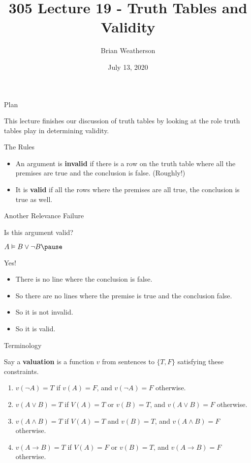 \documentclass[
  ignorenonframetext,
]{beamer}
\title{305 Lecture 19 - Truth Tables and Validity}
\author{Brian Weatherson}
\date{July 13, 2020}
\providecommand{\tightlist}{%
  \setlength{\itemsep}{0pt}\setlength{\parskip}{0pt}}
\renewcommand{\,}{\text{, }}
\renewenvironment*{quote}	
	{\list{}{\rightmargin   \leftmargin} \item } 	
	{\endlist }
\begin{document}
\frame{\titlepage}

\begin{frame}{Plan}
\protect\hypertarget{plan}{}

This lecture finishes our discussion of truth tables by looking at the
role truth tables play in determining validity.

\end{frame}

\begin{frame}{The Rules}
\protect\hypertarget{the-rules}{}

\begin{itemize}
\tightlist
\item
  An argument is \textbf{invalid} if there is a row on the truth table
  where all the premises are true and the conclusion is false.
  (Roughly!)
\item
  It is \textbf{valid} if all the rows where the premises are all true,
  the conclusion is true as well.
\end{itemize}

\end{frame}

\begin{frame}{Another Relevance Failure}
\protect\hypertarget{another-relevance-failure}{}

Is this argument valid?

\begin{quote}
\(A \vDash B \vee \neg B \pause\)
\end{quote}

Yes!

\begin{itemize}
\tightlist
\item
  There is no line where the conclusion is false.
\item
  So there are no lines where the premise is true and the conclusion
  false.
\item
  So it is not invalid.
\item
  So it is valid.
\end{itemize}

\end{frame}

\begin{frame}{Terminology}
\protect\hypertarget{terminology}{}

Say a \textbf{valuation} is a function \(v\) from sentences to
\(\{T, F\}\) satisfying these constraints.

\begin{enumerate}
\tightlist
\item
  \(v(\neg A) = T\) if \(v(A) = F\), and \(v(\neg A) = F\) otherwise.
\item
  \(v(A \vee B) = T\) if \(V(A) = T\) or \(v(B) = T\), and
  \(v(A \vee B) = F\) otherwise.
\item
  \(v(A \wedge B) = T\) if \(V(A) = T\) and \(v(B) = T\), and
  \(v(A \wedge B) = F\) otherwise.
\item
  \(v(A \rightarrow B) = T\) if \(V(A) = F\) or \(v(B) = T\), and
  \(v(A \rightarrow B) = F\) otherwise.
\end{enumerate}

\end{frame}
\end{document}
